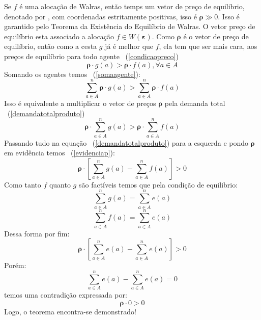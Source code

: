 \documentclass[12pt,a4paper]{article}
\begin{document}
Se $f$ é uma alocação de Walras, então temps um vetor de preço de equilibrio, denotado por \boldsymbol{\rho}, com coordenadas estritamente positivas, isso é $\boldsymbol{\rho} \gg 0$. Isso é garantido pelo Teorema da Existência do Equilíbrio de Walras. O vetor preço de equilíbrio esta associado a alocação $f \in W(\boldsymbol{\varepsilon})$.
Como $\boldsymbol{\rho}$ é o vetor de preço de equilíbrio, então como a cesta $g$ já é melhor que $f$, ela tem que ser mais cara, aos preços de equilíbrio para todo agente ~(\ref{condicaopreco})
\begin{equation}
    \boldsymbol{\rho}\cdot g(a) > \boldsymbol{\rho}\cdot f(a), \forall a \in A
    \label{condicaopreco}
\end{equation}
Somando os agentes temos ~(\ref{somaagente}):
\begin{equation}
    \sum_{a \in A}^{n}\boldsymbol{\rho}\cdot g(a)  > \sum_{a \in A}^{n}\boldsymbol{\rho}\cdot f(a) 
        \label{somaagente}
\end{equation}
Isso é equivalente a multiplicar o vetor de preços $\boldsymbol{\rho}$ pela demanda total ~(\ref{demandatotalproduto})
\begin{equation}
    \boldsymbol{\rho}\cdot \sum_{a \in A}^{n}g(a)  > \boldsymbol{\rho}\cdot \sum_{a \in A}^{n}f(a)
    \label{demandatotalproduto}
\end{equation}
Passando tudo na equação ~(\ref{demandatotalproduto}) para a esquerda e pondo $\boldsymbol{\rho}$ em evidência temos ~(\ref{evidenciap}): 
\begin{equation}
    \boldsymbol{\rho}\cdot \left[\sum_{a \in A}^{n}g(a) - \sum_{a \in A}^{n}f(a)\right] > 0
    \label{evidenciap}
\end{equation}
Como tanto $f$ quanto $g$ são factíveis temos que pela condição de equilibrio:
\begin{equation}
    \sum_{a \in A}^{n} g(a) = \sum_{a \in A}^{n} e(a)
\end{equation}
\begin{equation}
    \sum_{a \in A}^{n} f(a) = \sum_{a \in A}^{n} e(a)
\end{equation}
Dessa forma por fim:
\begin{equation}
    \boldsymbol{\rho}\cdot \left[\sum_{a \in A}^{n}e(a) - \sum_{a \in A}^{n}e(a)\right] > 0
\end{equation}
Porém:
\begin{equation}
    \sum_{a \in A}^{n}e(a) - \sum_{a \in A}^{n}e(a) = 0
\end{equation}
temos uma contradição expressada por: 
\begin{equation}
    \boldsymbol{\rho}\cdot 0 > 0
\end{equation}
Logo, o teorema encontra-se demonstrado!
\end{document}
